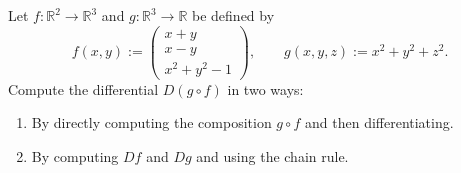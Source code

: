 \begin{exercise}
\label{ex:chain_rule_computation_paschoud}
Let $f: \mathbb{R}^2 \to \mathbb{R}^3$ and $g: \mathbb{R}^3 \to \mathbb{R}$ be defined by
\[f(x,y) := \begin{pmatrix} x+y \\ x-y \\ x^2+y^2-1 \end{pmatrix}, \qquad g(x,y,z) := x^2+y^2+z^2.\]
Compute the differential $D(g \circ f)$ in two ways:
\begin{enumerate}[label=\textbf{(\alph*)}]
  \item By directly computing the composition $g \circ f$ and then differentiating.
  \item By computing $Df$ and $Dg$ and using the chain rule.
\end{enumerate}
\end{exercise}


